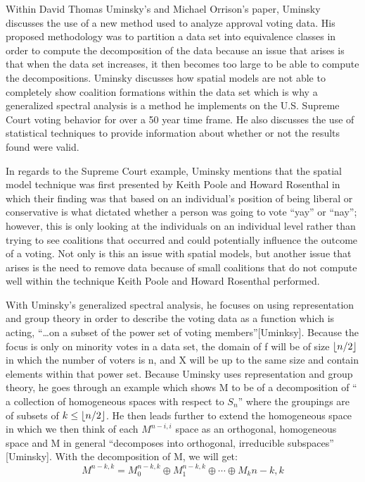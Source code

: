 \documentclass{article}
\DeclarePairedDelimiter\floor{\lfloor}{\rfloor}
\theoremstyle{remark}
\theoremstyle{definition}
\begin{document}
	Within David Thomas Uminsky’s and Michael Orrison’s paper, Uminsky discusses the use of a new method used to analyze approval voting data. His proposed methodology was to partition a data set into equivalence classes in order to compute the decomposition of the data because an issue that arises is that when the data set increases, it then becomes too large to be able to compute the decompositions. Uminsky discusses how spatial models are not able to completely show coalition formations within the data set which is why a generalized spectral analysis is a method he implements on the U.S. Supreme Court voting behavior for over a 50 year time frame. He also discusses the use of statistical techniques to provide information about whether or not the results found were valid. \par
	In regards to the Supreme Court example, Uminsky mentions that the spatial model technique was first presented by Keith Poole and Howard Rosenthal in which their finding was that based on an individual’s position of being liberal or conservative is what dictated whether a person was going to vote “yay” or “nay”; however, this is only looking at the individuals on an individual level rather than trying to see coalitions that occurred and could potentially influence the outcome of a voting. Not only is this an issue with spatial models, but another issue that arises is the need to remove data because of small coalitions that do not compute well within the technique Keith Poole and Howard Rosenthal performed. \par 
	With Uminsky’s generalized spectral analysis,  he focuses on using representation and group theory in order to describe the voting data as a function which is acting, “…on a subset of the power set of voting members”[Uminksy]. Because the focus is only on minority votes in a data set, the domain of f will be of size $ \floor{n/2} $ in which the number of voters is n, and X will be up to the same size and contain elements within that power set. Because Uminsky uses representation and group theory, he goes through an example which shows M to be of a decomposition of “ a collection of homogeneous spaces with respect to $S_n$” where the groupings are of subsets of $k\leq \floor{n/2}$.
He then leads further to extend the homogeneous space in which we then think of each $M^{n-i,i}$ space as an orthogonal, homogeneous space and M in general “decomposes into orthogonal, irreducible subspaces” [Uminsky]. With the decomposition of M, we will get:
\begin{equation}
  M^{n-k,k}=M_0^{n-k,k} \oplus M_1^{n-k,k} \oplus \cdots \oplus M_k{n-k,k}  
\end{equation}
\end{document}
